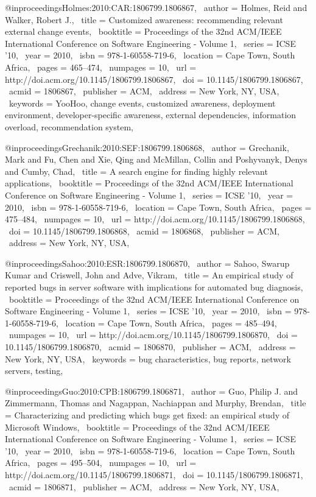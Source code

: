 @inproceedings{Holmes:2010:CAR:1806799.1806867,
 author = {Holmes, Reid and Walker, Robert J.},
 title = {Customized awareness: recommending relevant external change events},
 booktitle = {Proceedings of the 32nd ACM/IEEE International Conference on Software Engineering - Volume 1},
 series = {ICSE '10},
 year = {2010},
 isbn = {978-1-60558-719-6},
 location = {Cape Town, South Africa},
 pages = {465--474},
 numpages = {10},
 url = {http://doi.acm.org/10.1145/1806799.1806867},
 doi = {10.1145/1806799.1806867},
 acmid = {1806867},
 publisher = {ACM},
 address = {New York, NY, USA},
 keywords = {YooHoo, change events, customized awareness, deployment environment, developer-specific awareness, external dependencies, information overload, recommendation system},
} 

@inproceedings{Grechanik:2010:SEF:1806799.1806868,
 author = {Grechanik, Mark and Fu, Chen and Xie, Qing and McMillan, Collin and Poshyvanyk, Denys and Cumby, Chad},
 title = {A search engine for finding highly relevant applications},
 booktitle = {Proceedings of the 32nd ACM/IEEE International Conference on Software Engineering - Volume 1},
 series = {ICSE '10},
 year = {2010},
 isbn = {978-1-60558-719-6},
 location = {Cape Town, South Africa},
 pages = {475--484},
 numpages = {10},
 url = {http://doi.acm.org/10.1145/1806799.1806868},
 doi = {10.1145/1806799.1806868},
 acmid = {1806868},
 publisher = {ACM},
 address = {New York, NY, USA},
} 

@inproceedings{Sahoo:2010:ESR:1806799.1806870,
 author = {Sahoo, Swarup Kumar and Criswell, John and Adve, Vikram},
 title = {An empirical study of reported bugs in server software with implications for automated bug diagnosis},
 booktitle = {Proceedings of the 32nd ACM/IEEE International Conference on Software Engineering - Volume 1},
 series = {ICSE '10},
 year = {2010},
 isbn = {978-1-60558-719-6},
 location = {Cape Town, South Africa},
 pages = {485--494},
 numpages = {10},
 url = {http://doi.acm.org/10.1145/1806799.1806870},
 doi = {10.1145/1806799.1806870},
 acmid = {1806870},
 publisher = {ACM},
 address = {New York, NY, USA},
 keywords = {bug characteristics, bug reports, network servers, testing},
} 

@inproceedings{Guo:2010:CPB:1806799.1806871,
 author = {Guo, Philip J. and Zimmermann, Thomas and Nagappan, Nachiappan and Murphy, Brendan},
 title = {Characterizing and predicting which bugs get fixed: an empirical study of Microsoft Windows},
 booktitle = {Proceedings of the 32nd ACM/IEEE International Conference on Software Engineering - Volume 1},
 series = {ICSE '10},
 year = {2010},
 isbn = {978-1-60558-719-6},
 location = {Cape Town, South Africa},
 pages = {495--504},
 numpages = {10},
 url = {http://doi.acm.org/10.1145/1806799.1806871},
 doi = {10.1145/1806799.1806871},
 acmid = {1806871},
 publisher = {ACM},
 address = {New York, NY, USA},
} 

